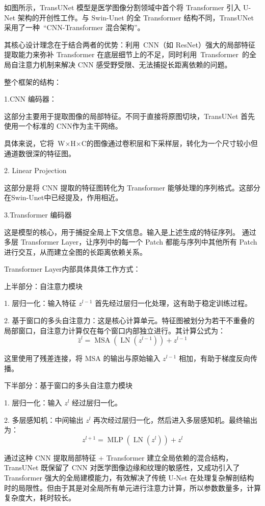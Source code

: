 \documentclass[twoside,openright]{xduugthesis}
\begin{document}
如图所示，TransUNet 模型是医学图像分割领域中首个将 Transformer 引入 U-Net 架构的开创性工作。与 Swin-Unet 的全 Transformer 结构不同，TransUNet 采用了一种 “CNN-Transformer 混合架构”。

其核心设计理念在于结合两者的优势：利用 CNN（如 ResNet）强大的局部特征提取能力来弥补 Transformer 在底层细节上的不足，同时利用 Transformer 的全局自注意力机制来解决 CNN 感受野受限、无法捕捉长距离依赖的问题。

整个框架的结构：

1.CNN 编码器：

	这部分主要用于提取图像的局部特征。不同于直接将原图切块，TransUNet 首先使用一个标准的 CNN作为主干网络。
    
具体来说，它将 W×H×C的图像通过卷积层和下采样层，转化为一个尺寸较小但通道数很深的特征图。

2.  Linear Projection

	这部分是将 CNN 提取的特征图转化为 Transformer 能够处理的序列格式。这部分在Swin-Unet中已经提及，作用相近。
    
3.Transformer 编码器

	这是模型的核心，用于捕捉全局上下文信息。输入是上述生成的特征序列。
通过多层 Transformer Layer，让序列中的每一个 Patch 都能与序列中其他所有 Patch 进行交互，从而建立全图的长距离依赖关系。

Transformer Layer内部具体具体工作方式：

上半部分：自注意力模块

1. 层归一化：输入特征 $z^{l-1}$ 首先经过层归一化处理，这有助于稳定训练过程。

2. 基于窗口的多头自注意力：这是核心计算单元。特征图被划分为若干不重叠的局部窗口，自注意力计算仅在每个窗口内部独立进行。其计算公式为：
\begin{equation}
\hat{z}^{l} = \operatorname{MSA}(\operatorname{LN}(z^{l-1})) + z^{l-1}
\end{equation}

这里使用了残差连接，将 MSA 的输出与原始输入 $z^{l-1}$ 相加，有助于梯度反向传播。

下半部分：基于窗口的多头自注意力模块

1. 层归一化：输入 $z^{l}$ 经过层归一化。

2. 多层感知机：中间输出 $z^{l}$ 再次经过层归一化，然后进入多层感知机。最终输出为：
\begin{equation}
z^{l+1} = \operatorname{MLP}(\operatorname{LN}(z^{l})) + z^{l}
\end{equation}

通过这种 CNN 提取局部特征 + Transformer 建立全局依赖的混合结构，TransUNet 既保留了 CNN 对医学图像边缘和纹理的敏感性，又成功引入了 Transformer 强大的全局建模能力，有效解决了传统 U-Net 在处理复杂解剖结构时的局限性。但由于其是对全局所有单元进行注意力计算，所以参数数量多，计算复杂度大，耗时较长。
\end{document}
